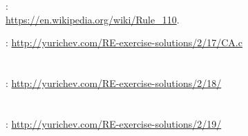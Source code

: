 \section{}

:\\
\url{https://en.wikipedia.org/wiki/Rule_110}.

\Sourcecode: \url{http://yurichev.com/RE-exercise-solutions/2/17/CA.c}

\section{}

\Sourcecode: \url{http://yurichev.com/RE-exercise-solutions/2/18/}

\section{}

\Sourcecode: \url{http://yurichev.com/RE-exercise-solutions/2/19/}

